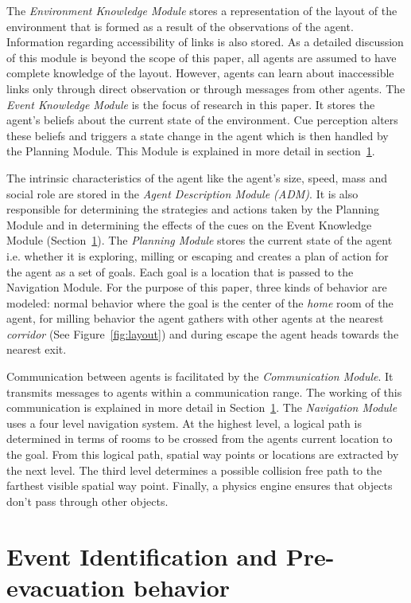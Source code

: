 The \emph{Environment Knowledge Module} stores a representation of the layout of the environment that is formed as a result of the observations of the agent. Information regarding accessibility of links is also stored. As a detailed discussion of this module is beyond the scope of this paper, all agents are assumed to have complete knowledge of the layout. However, agents can learn about inaccessible links only through direct observation or through messages from other agents. The {\em Event Knowledge Module} is the focus of research in this paper. It stores the agent's beliefs about the current state of the environment. Cue perception alters these beliefs and triggers a state change in the agent which is then handled by the Planning Module. This Module is explained in more detail in section~\ref{EventIdentification}.

The intrinsic characteristics of the agent like the agent's size, speed, mass and social role are stored in the {\em Agent Description Module (ADM)}. It is also responsible for determining the strategies and actions taken by the Planning Module and in determining the effects of the cues on the Event Knowledge Module (Section~\ref{EventIdentification}). The {\em Planning Module} stores the current state of the agent i.e. whether it is exploring, milling or escaping and creates a plan of action for the agent as a set of goals. Each goal is a location that is passed to the Navigation Module. For the purpose of this paper, three kinds of behavior are modeled: normal behavior where the goal is the center of the \emph{home} room of the agent, for milling behavior the agent gathers with other agents at the nearest \emph{corridor} (See Figure~\ref{fig:layout}) and during escape the agent heads towards the nearest exit.

Communication between agents is facilitated by the {\em Communication Module}. It transmits messages to agents within a communication range. The working of this communication is explained in more detail in Section~\ref{EventIdentification}. The {\em Navigation Module} uses a four level navigation system. At the highest level, a logical path is determined in terms of rooms to be crossed from the agents current location to the goal. From this logical path, spatial way points or locations are extracted by the next level. The third level determines a possible collision free path to the farthest visible spatial way point. Finally, a physics engine ensures that objects don't pass through other objects.

\section{Event Identification and Pre-evacuation behavior}
\label{EventIdentification}

